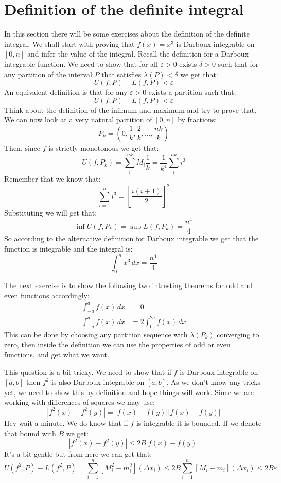 \documentclass[11pt,a4paper]{article}
\begin{document}
	\newpage
	
	\section{Definition of the definite integral}
	In this section there will be some exercises about the definition
	of the definite integral. We shall start with proving that $f(x) = x^3$
	is Darboux integrable on $[0,n]$ and infer the value of the integral.
	Recall the definition for a Darboux integrable function. We need to show
	that for all $\varepsilon > 0$ exists $\delta > 0$ such that for any
	partition of the interval $P$ that satisfies $\lambda(P) < \delta$ we
	get that:
	\[
		U(f,P) - L(f,P) < \varepsilon
	\]
	An equivalent definition is that for any $\varepsilon > 0$ exists a
	partition such that:
	\[
		U(f,P) - L(f,P) < \varepsilon
	\]
	Think about the definition of the infimum and maximum and try to prove
	that. We can now look at a very natural partition of $[0,n]$ by fractions:
	\[
		P_k = \left(0,\frac 1k, \frac 2k, \dots, \frac {nk}{k}\right)
	\]
	Then, since $f$ is strictly monotonous we get that:
	\[
		U(f, P_k) = 
		\sum_{i}^{nk}{M_i\frac 1k} = 
		\frac {1}{k^4} \sum_{i}^{nk}{i^3}
	\]
	Remember that we know that:
	\[
		\sum_{i=1}^{n}{i^3} = \left[\frac{i(i+1)}{2}\right]^2
	\]
	Substituting we will get that:
	\[
		\inf U(f, P_k) = \sup L(f, P_k) = \frac{n^4}{4}
	\]
	So according to the alternative definition for Darboux integrable we
	get that the function is integrable and the integral is:
	\[
		\int_{0}^{n}{x^3\,dx} = \frac{n^4}{4}
	\]
	
	\newpage
	
	The next exercise is to show the following two intresting theorems for
	odd and even functions accordingly:
	\begin{align*}
		\int_{-a}^{a}{f(x)\,dx} &= 0 \\
		\int_{-a}^{a}{f(x)\,dx} &= 2\int_{0}^{2a}{f(x)\,dx}
	\end{align*}
	This can be done by choosing any partition sequence with $\lambda(P_k)$
	converging to zero, then inside the definition we can use the properties
	of odd or even functions, and get what we want.
	
	\newpage
	
	This question is a bit tricky. We need to show that if $f$ is Darboux
	integrable on $[a,b]$ then $f^2$ is also Darboux integrable on $[a,b]$.
	As we don't know any tricks yet, we need to show this by definition and
	hope things will work. Since we are working with differences of squares
	we may use:
	\[
		|f^2(x) - f^2(y)| = |f(x) + f(y)||f(x) - f(y)|
	\]
	Hey wait a minute. We do know that if $f$ is integrable it is bounded.
	If we denote that bound with $B$ we get:
	\[
		|f^2(x) - f^2(y)| \le 2B|f(x) - f(y)|
	\]
	It's a bit gentle but from here we can get that:
	\[
		U(f^2,P) - L(f^2,P) = \sum_{i=1}^{n}{[M^2_i-m^2_i](\Delta x_i)} \le
		2B\sum_{i=1}^{n}{[M_i-m_i](\Delta x_i)} \le 2B\varepsilon
	\]
	
\end{document}
